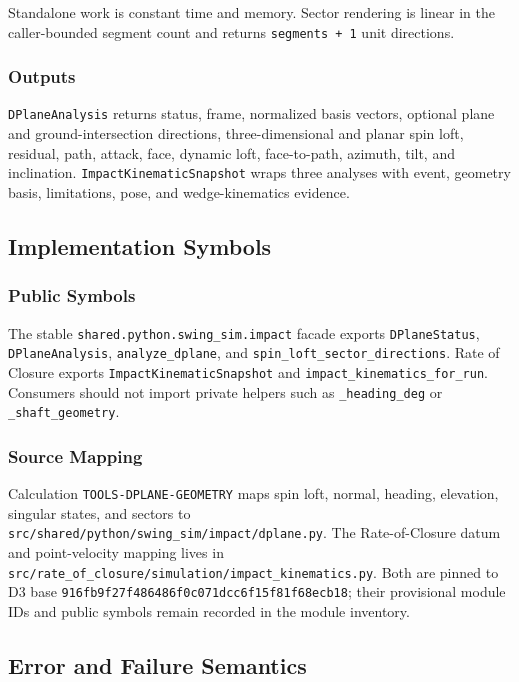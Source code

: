 \documentclass[
  american,
]{article}
\begin{document}
Standalone work is constant time and memory. Sector rendering is linear
in the caller-bounded segment count and returns \texttt{segments\ +\ 1}
unit directions.

\subsubsection{Outputs}\label{outputs}

\texttt{DPlaneAnalysis} returns status, frame, normalized basis vectors,
optional plane and ground-intersection directions, three-dimensional and
planar spin loft, residual, path, attack, face, dynamic loft,
face-to-path, azimuth, tilt, and inclination.
\texttt{ImpactKinematicSnapshot} wraps three analyses with event,
geometry basis, limitations, pose, and wedge-kinematics evidence.

\subsection{Implementation Symbols}\label{implementation-symbols}

\subsubsection{Public Symbols}\label{public-symbols}

The stable \texttt{shared.python.swing\_sim.impact} facade exports
\texttt{DPlaneStatus}, \texttt{DPlaneAnalysis},
\texttt{analyze\_dplane}, and \texttt{spin\_loft\_sector\_directions}.
Rate of Closure exports \texttt{ImpactKinematicSnapshot} and
\texttt{impact\_kinematics\_for\_run}. Consumers should not import
private helpers such as \texttt{\_heading\_deg} or
\texttt{\_shaft\_geometry}.

\subsubsection{Source Mapping}\label{source-mapping}

Calculation \texttt{TOOLS-DPLANE-GEOMETRY} maps spin loft, normal,
heading, elevation, singular states, and sectors to
\texttt{src/shared/python/swing\_sim/impact/dplane.py}. The
Rate-of-Closure datum and point-velocity mapping lives in
\texttt{src/rate\_of\_closure/simulation/impact\_kinematics.py}. Both
are pinned to D3 base \texttt{916fb9f27f486486f0c071dcc6f15f81f68ecb18};
their provisional module IDs and public symbols remain recorded in the
module inventory.

\subsection{Error and Failure
Semantics}\label{error-and-failure-semantics}
\end{document}
